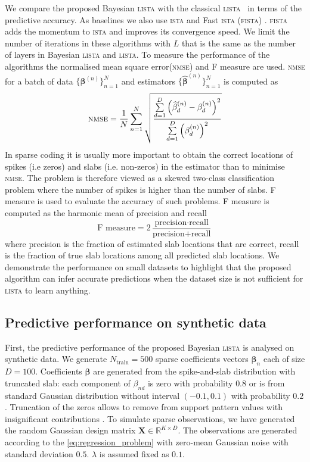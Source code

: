 \documentclass[letterpaper]{article}
\begin{document}
We compare the proposed Bayesian \textsc{lista} with the classical \textsc{lista}~\citep{gregor2010learning} in terms of the predictive accuracy. As baselines we also use \textsc{ista} \citep{daubechies2004iterative} and Fast \textsc{ista} (\textsc{fista}) \citep{beck2009fast}. \textsc{fista} adds the momentum to \textsc{ista} and improves its convergence speed. We limit the number of iterations in these algorithms with $L$ that is the same as the number of layers in Bayesian \textsc{lista} and \textsc{lista}. To measure the performance of the algorithms the normalised mean square error(\textsc{nmse}) and F measure are used. \textsc{nmse} for a batch of data $\{\boldsymbol\beta^{(n)}\}_{n=1}^{N}$ and estimators $\{\widehat{\boldsymbol\beta}^{(n)}\}_{n=1}^{N}$ is computed as
\begin{equation}
\text{\textsc{nmse}} = \frac{1}{N}\sum\limits_{n=1}^N\sqrt{\frac{\sum\limits_{d=1}^D\left(\widehat{\beta}_{d}^{(n)} - \beta_d^{(n)}\right)^2}{\sum\limits_{d=1}^D\left(\beta_{d}^{(n)}\right)^2}}
\end{equation}
In sparse coding it is usually more important to obtain the correct locations of spikes (i.e zeros) and slabs (i.e. non-zeros) in the estimator than to minimise \textsc{nmse}. The problem is therefore viewed as a skewed two-class classification problem where the number of spikes is higher than the number of slabs. F measure is used to evaluate the accuracy of such problems. 
F measure is computed as the harmonic mean of precision and recall
\begin{equation}
\text{F measure} = 2\dfrac{\text{precision}\cdot\text{recall}}{\text{precision} + \text{recall}}
\end{equation} 
where precision is the fraction of estimated slab locations that are correct, recall is the fraction of true slab locations among all predicted slab locations.
We demonstrate the performance on small datasets to highlight that the proposed algorithm can infer accurate predictions when the dataset size is not sufficient for \textsc{lista} to learn anything. 

\subsection{Predictive performance on synthetic data}
First, the predictive performance of the proposed Bayesian \textsc{lista} is analysed on synthetic data. We generate $N_\text{train}=500$ sparse coefficients vectors $\boldsymbol\beta_n$ each of size $D = 100$. Coefficients $\boldsymbol\beta$ are generated from the spike-and-slab distribution with truncated slab: each component of $\beta_{nd}$ is zero with probability $0.8$ or is from standard Gaussian distribution without interval $(-0.1, 0.1)$ with probability $0.2$. Truncation of the zeros allows to remove from support pattern values with insignificant contributions \citep{xin2016maximal}. To simulate sparse observations, we have generated the random Gaussian design matrix $\mathbf{X} \in \mathbb{R}^{K \times D}$.  The observations are generated according to the \ref{eq:regression_problem} with zero-mean Gaussian noise with standard deviation $0.5$. $\lambda$ is assumed fixed as $0.1$.
\end{document}
